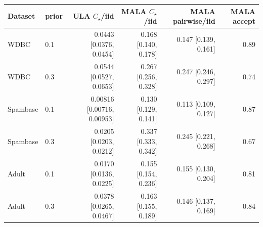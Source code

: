 \begin{tabular}{llrrrr}
\toprule
Dataset & prior & ULA $C_\star$/iid & MALA $C_\star$/iid & MALA pairwise/iid & MALA accept \\
\midrule
WDBC & 0.1 & 0.0443 [0.0376, 0.0454] & 0.168 [0.140, 0.178] & 0.147 [0.139, 0.161] & 0.89 \\
WDBC & 0.3 & 0.0544 [0.0527, 0.0653] & 0.267 [0.256, 0.328] & 0.247 [0.246, 0.297] & 0.74 \\
Spambase & 0.1 & 0.00816 [0.00716, 0.00953] & 0.130 [0.129, 0.141] & 0.113 [0.109, 0.127] & 0.87 \\
Spambase & 0.3 & 0.0205 [0.0203, 0.0212] & 0.337 [0.333, 0.342] & 0.245 [0.221, 0.268] & 0.67 \\
Adult & 0.1 & 0.0170 [0.0136, 0.0225] & 0.155 [0.154, 0.236] & 0.155 [0.130, 0.204] & 0.81 \\
Adult & 0.3 & 0.0378 [0.0265, 0.0467] & 0.163 [0.155, 0.189] & 0.146 [0.137, 0.169] & 0.84 \\
\bottomrule
\end{tabular}
